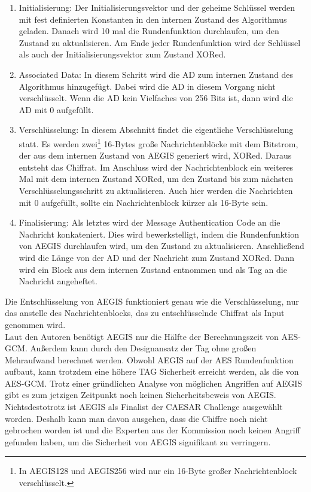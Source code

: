 \begin{enumerate}
\item Initialisierung: Der Initialisierungsvektor und der geheime Schlüssel werden mit fest definierten Konstanten in den internen Zustand des Algorithmus geladen. Danach wird 10 mal die Rundenfunktion durchlaufen, um den Zustand zu aktualisieren. Am Ende jeder Rundenfunktion wird der Schlüssel als auch der Initialisierungsvektor zum Zustand XORed.
\item Associated Data: In diesem Schritt wird die \gls{AD} zum internen Zustand des Algorithmus hinzugefügt. Dabei wird die \gls{AD} in diesem Vorgang nicht verschlüsselt. Wenn die \gls{AD} kein Vielfaches von 256 Bits ist, dann wird die \gls{AD} mit 0 aufgefüllt.
\item Verschlüsselung: In diesem Abschnitt findet die eigentliche Verschlüsselung statt. Es werden zwei\footnote[10]{In AEGIS128 und AEGIS256 wird nur ein 16-Byte großer Nachrichtenblock verschlüsselt.} 16-Bytes große Nachrichtenblöcke mit dem Bitstrom, der aus dem internen Zustand von AEGIS generiert wird, XORed. Daraus entsteht das Chiffrat. Im Anschluss wird der Nachrichtenblock ein weiteres Mal mit dem internen Zustand XORed, um den Zustand bis zum nächsten Verschlüsselungsschritt zu aktualisieren. Auch hier werden die Nachrichten mit 0 aufgefüllt, sollte ein Nachrichtenblock kürzer als 16-Byte sein.
\item Finalisierung: Als letztes wird der Message Authentication Code an die Nachricht konkateniert. Dies wird bewerkstelligt, indem die Rundenfunktion von AEGIS durchlaufen wird, um den Zustand zu aktualisieren. Anschließend wird die Länge von der \gls{AD} und der Nachricht zum Zustand XORed. Dann wird ein Block aus dem internen Zustand entnommen und als Tag an die Nachricht angeheftet.
\end{enumerate} 
Die Entschlüsselung von AEGIS funktioniert genau wie die Verschlüsselung, nur das anstelle des Nachrichtenblocks, das zu entschlüsselnde Chiffrat als Input genommen wird.\\
Laut den Autoren benötigt AEGIS nur die Hälfte der Berechnungszeit von \gls{AES-GCM}. Außerdem kann durch den Designansatz der Tag ohne großen Mehraufwand berechnet werden. Obwohl AEGIS auf der AES Rundenfunktion aufbaut, kann trotzdem eine höhere TAG Sicherheit erreicht werden, als die von AES-GCM. Trotz einer gründlichen Analyse von möglichen Angriffen auf AEGIS gibt es zum jetzigen Zeitpunkt noch keinen Sicherheitsbeweis von AEGIS. Nichtsdestotrotz ist AEGIS als Finalist der \gls{CAESAR} Challenge ausgewählt worden. Deshalb kann man davon ausgehen, dass die Chiffre noch nicht gebrochen worden ist und die Experten aus der Kommission noch keinen Angriff gefunden haben, um die Sicherheit von AEGIS signifikant zu verringern.\cite{10.1007/978-3-662-43414-7_10}\cite{mosnavcekoptimizing}
